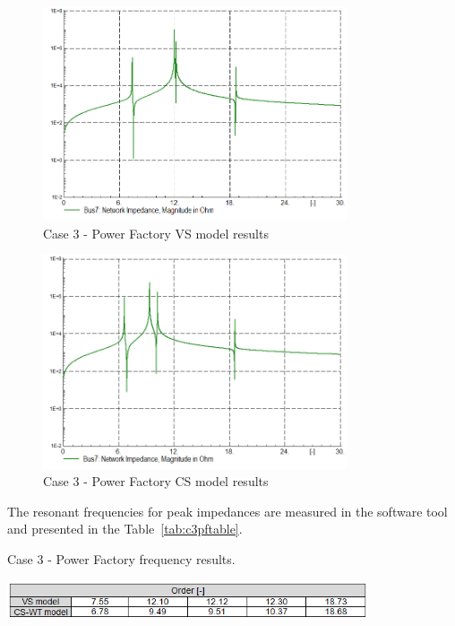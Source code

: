 \documentclass[12pt]{report} %
\begin{document}
\begin{figure}[htb]
	\centering
	\includegraphics[width=0.8\textwidth]{img/Case3/PF_imp7_VS.PNG}
  	\caption{Case 3 - Power Factory VS model results}
  	\label{fig:c3pfvs1}
\end{figure}
\FloatBarrier

\begin{figure}[htb]
	\centering
	\includegraphics[width=0.8\textwidth]{img/Case3/PF_imp7_CS.PNG}
  	\caption{Case 3 - Power Factory CS model results}
  	\label{fig:c3pfcs1}
\end{figure}
\FloatBarrier

The resonant frequencies for peak impedances are measured in the software tool and presented in the Table~\ref{tab:c3pftable}.

\begin{table}[htb]
	\centering
	\caption{Case 3 - Power Factory frequency results.}
	\includegraphics[width=0.8\textwidth]{img/Case3/table_powerfactory.PNG}
  	\label{tab:c3pftable}
\end{table}
\FloatBarrier
\end{document}
